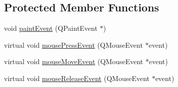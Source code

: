 \subsection*{Protected Member Functions}
\begin{DoxyCompactItemize}
\item 
void \hyperlink{class_u_b_magnifier_a35fff03d6240e01b251e565c9c9b9580}{paint\-Event} (Q\-Paint\-Event $\ast$)
\item 
virtual void \hyperlink{class_u_b_magnifier_af3c9c7f0e06bf952c078cbb057222054}{mouse\-Press\-Event} (Q\-Mouse\-Event $\ast$event)
\item 
virtual void \hyperlink{class_u_b_magnifier_ab2ff884e4c336b812ad0d95c3420a335}{mouse\-Move\-Event} (Q\-Mouse\-Event $\ast$event)
\item 
virtual void \hyperlink{class_u_b_magnifier_abd134ba742de847c34f55d263e9809d6}{mouse\-Release\-Event} (Q\-Mouse\-Event $\ast$event)
\end{DoxyCompactItemize}
